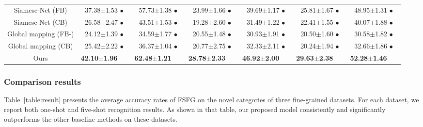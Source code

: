 \documentclass[10pt,twocolumn,letterpaper]{article}
\begin{document}
\begin{table*}[t]
\begin{tabular}{|c|c|c|c|c|c|c|}
  Siamese-Net (FB) &    37.38{\scriptsize$\pm$1.53} $\bullet$  &  57.73{\scriptsize$\pm$1.38} $\bullet$  &  23.99{\scriptsize$\pm$1.66} $\bullet$  &  39.69{\scriptsize$\pm$1.17} $\bullet$  & 25.81{\scriptsize$\pm$1.67} $\bullet$   &  48.95{\scriptsize$\pm$1.31} $\bullet$  \\
  Siamese-Net (CB) &    26.58{\scriptsize$\pm$2.47} $\bullet$  &  43.51{\scriptsize$\pm$1.53} $\bullet$  &  19.28{\scriptsize$\pm$2.60} $\bullet$  &  31.49{\scriptsize$\pm$1.22} $\bullet$  & 22.41{\scriptsize$\pm$1.55} $\bullet$   &  40.07{\scriptsize$\pm$1.88} $\bullet$   \\
  Global mapping (FB-) &    24.12{\scriptsize$\pm$1.39} $\bullet$  &   34.59{\scriptsize$\pm$1.77} $\bullet$ &  20.55{\scriptsize$\pm$1.48} $\bullet$  &  30.93{\scriptsize$\pm$1.91} $\bullet$  &  20.50{\scriptsize$\pm$1.60} $\bullet$  &   30.58{\scriptsize$\pm$1.82} $\bullet$  \\
  Global mapping (CB) &  25.42{\scriptsize$\pm$2.22} $\bullet$  &   36.37{\scriptsize$\pm$1.04} $\bullet$ &  20.77{\scriptsize$\pm$2.75} $\bullet$  &  32.33{\scriptsize$\pm$2.11} $\bullet$  &  20.24{\scriptsize$\pm$1.94} $\bullet$  &   32.66{\scriptsize$\pm$1.86} $\bullet$  \\
  \hline
  \hline
  Ours & \textbf{42.10{\scriptsize$\pm$1.96}}~~~    &  \textbf{62.48{\scriptsize$\pm$1.21}}~~~  & \textbf{28.78{\scriptsize$\pm$2.33}}~~~   &  \textbf{46.92{\scriptsize$\pm$2.00}}~~~  &  \textbf{29.63{\scriptsize$\pm$2.38}}~~~  &   \textbf{52.28{\scriptsize$\pm$1.46}}~~~  \\
  \hline
 \end{tabular}
\end{table*}

\subsubsection{Comparison results}

Table~\ref{table:result} presents the average accuracy rates of FSFG on the novel categories of three fine-grained datasets. For each dataset, we report both one-shot and five-shot recognition results. As shown in that table, our proposed model consistently and significantly outperforms the other baseline methods on these datasets.
\end{document}

